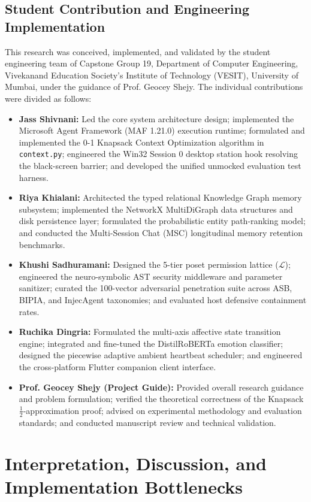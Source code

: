 \documentclass[conference,a4paper]{IEEEtran}
\begin{document}
\subsection{Student Contribution and Engineering Implementation}
This research was conceived, implemented, and validated by the student engineering team of Capstone Group 19, Department of Computer Engineering, Vivekanand Education Society's Institute of Technology (VESIT), University of Mumbai, under the guidance of Prof. Geocey Shejy. The individual contributions were divided as follows:
\begin{itemize}
    \item \textbf{Jass Shivnani:} Led the core system architecture design; implemented the Microsoft Agent Framework (MAF 1.21.0) execution runtime; formulated and implemented the 0-1 Knapsack Context Optimization algorithm in \texttt{context.py}; engineered the Win32 Session 0 desktop station hook resolving the black-screen barrier; and developed the unified unmocked evaluation test harness.
    \item \textbf{Riya Khialani:} Architected the typed relational Knowledge Graph memory subsystem; implemented the NetworkX MultiDiGraph data structures and disk persistence layer; formulated the probabilistic entity path-ranking model; and conducted the Multi-Session Chat (MSC) longitudinal memory retention benchmarks.
    \item \textbf{Khushi Sadhuramani:} Designed the 5-tier poset permission lattice ($\mathcal{L}$); engineered the neuro-symbolic AST security middleware and parameter sanitizer; curated the 100-vector adversarial penetration suite across ASB, BIPIA, and InjecAgent taxonomies; and evaluated host defensive containment rates.
    \item \textbf{Ruchika Dingria:} Formulated the multi-axis affective state transition engine; integrated and fine-tuned the DistilRoBERTa emotion classifier; designed the piecewise adaptive ambient heartbeat scheduler; and engineered the cross-platform Flutter companion client interface.
    \item \textbf{Prof. Geocey Shejy (Project Guide):} Provided overall research guidance and problem formulation; verified the theoretical correctness of the Knapsack $\frac{1}{2}$-approximation proof; advised on experimental methodology and evaluation standards; and conducted manuscript review and technical validation.
\end{itemize}

\section{Interpretation, Discussion, and Implementation Bottlenecks}
\end{document}
